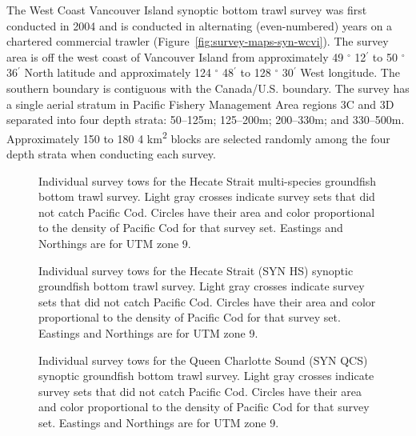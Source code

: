 \documentclass[11pt]{book}
\begin{document}
The West Coast Vancouver Island synoptic bottom trawl survey was first conducted in 2004 and is conducted in alternating (even-numbered) years on a chartered commercial trawler (Figure~\ref{fig:survey-maps-syn-wcvi}). The survey area is off the west coast of Vancouver Island from approximately 49 \(^\circ\) 12\(^\prime\) to 50 \(^\circ\) 36\(^\prime\) North latitude and approximately 124 \(^\circ\) 48\(^\prime\) to 128 \(^\circ\) 30\(^\prime\) West longitude. The southern boundary is contiguous with the Canada/U.S. boundary. The survey has a single aerial stratum in Pacific Fishery Management Area regions 3C and 3D separated into four depth strata: 50--125m; 125--200m; 200--330m; and 330--500m. Approximately 150 to 180 4 km\textsuperscript{2} blocks are selected randomly among the four depth strata when conducting each survey.
\begin{figure}[htb]

{\centering {} 

}

\caption{Individual survey tows for the Hecate Strait multi-species groundfish bottom trawl survey. Light gray crosses indicate survey sets that did not catch Pacific Cod. Circles have their area and color proportional to the density of Pacific Cod for that survey set. Eastings and Northings are for UTM zone 9.}\label{fig:survey-maps-hs-msa}
\end{figure}
\begin{figure}[htb]

{\centering {} 

}

\caption{Individual survey tows for the Hecate Strait (SYN HS) synoptic groundfish bottom trawl survey. Light gray crosses indicate survey sets that did not catch Pacific Cod. Circles have their area and color proportional to the density of Pacific Cod for that survey set. Eastings and Northings are for UTM zone 9.}\label{fig:survey-maps-syn-hs}
\end{figure}
\begin{figure}[htb]

{\centering {} 

}

\caption{Individual survey tows for the Queen Charlotte Sound (SYN QCS) synoptic groundfish bottom trawl survey. Light gray crosses indicate survey sets that did not catch Pacific Cod. Circles have their area and color proportional to the density of Pacific Cod for that survey set. Eastings and Northings are for UTM zone 9.}\label{fig:survey-maps-syn-qcs}
\end{figure}
\end{document}
